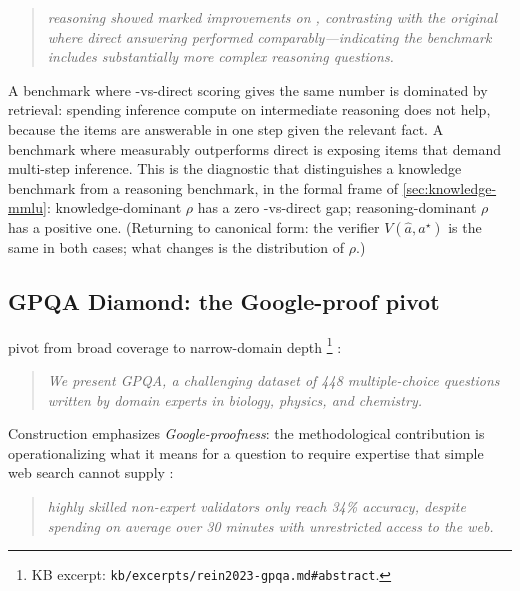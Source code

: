 \begin{quote}\itshape
{} reasoning showed marked improvements on ,
contrasting with the original  where direct answering performed
comparably---indicating the benchmark includes substantially more
complex reasoning questions.
\end{quote}

\begin{intuition}
A benchmark where -vs-direct scoring gives the same number is
dominated by retrieval: spending inference compute on intermediate
reasoning does not help, because the items are answerable in one
step given the relevant fact. A benchmark where  measurably
outperforms direct is exposing items that demand multi-step
inference. This is the diagnostic that distinguishes a knowledge
benchmark from a reasoning benchmark, in the formal frame of
\cref{sec:knowledge-mmlu}: knowledge-dominant $\rho$ has a
zero -vs-direct gap; reasoning-dominant $\rho$ has a positive
one. (Returning to canonical form: the verifier
$V(\hat{a}, a^\star)$ is the same in both cases; what changes is
the distribution of $\rho$.)
\end{intuition}

\subsection{GPQA Diamond: the Google-proof pivot}
\label{sec:knowledge-gpqa}

\citet{rein2023-gpqa} pivot from broad coverage to narrow-domain depth%
\footnote{KB excerpt: \nolinkurl{kb/excerpts/rein2023-gpqa.md#abstract}.}
\citep[\S{}abstract]{rein2023-gpqa}:

\begin{quote}\itshape
We present GPQA, a challenging dataset of 448 multiple-choice questions
written by domain experts in biology, physics, and chemistry.
\end{quote}

Construction emphasizes \emph{Google-proofness}: the methodological
contribution is operationalizing what it means for a question to
require expertise that simple web search cannot supply
\citep[\S{}abstract]{rein2023-gpqa}:

\begin{quote}\itshape
highly skilled non-expert validators only reach 34\% accuracy, despite
spending on average over 30 minutes with unrestricted access to the web.
\end{quote}

